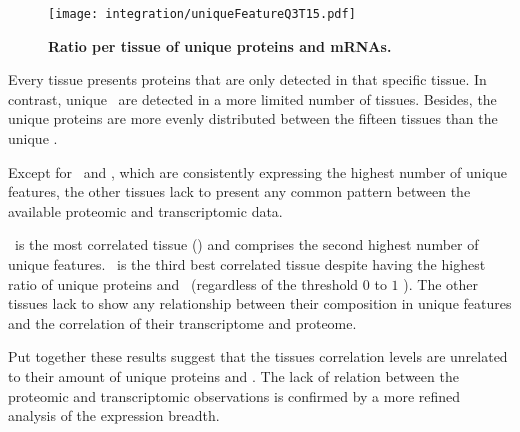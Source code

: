 \begin{figure}[!htb]
    \texttt{[image: integration/uniqueFeatureQ3T15.pdf]}\centering
    \vspace{-3mm}
    \caption[Ratio per tissue of unique proteins and mRNAs]{\label{fig:UniqueFeatureQ3T15}
    \textbf{Ratio per tissue of unique proteins and mRNAs.}
    }
\end{figure}

Every tissue presents proteins that are only detected in that specific tissue.
In contrast, unique \mRNAs\ are detected in a more limited number of tissues.
Besides, the unique proteins are more evenly distributed
between the fifteen tissues than the unique \mRNAs.

Except for \Testis\ and \Liver,
which are consistently expressing the highest number of unique features,
the other tissues lack to present any common pattern
between the available proteomic and transcriptomic data.

\Liver\ is the most correlated tissue ()
and comprises the second highest number of unique features.
\Testis\ is the third best correlated tissue
despite having the highest ratio of unique proteins and \mRNAs\
(regardless of the threshold $0$ to $1$ \FPKM).
The other tissues lack to show any relationship
between their composition in unique features
and the correlation of their transcriptome and proteome.

Put together these results suggest that
the tissues correlation levels are unrelated
to their amount of unique proteins and \mRNAs{}.
The lack of relation between the proteomic and transcriptomic observations
is confirmed by a more refined analysis of the expression breadth.

